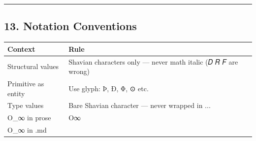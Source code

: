 \documentclass[12pt,a4paper]{article}
\begin{document}
\begin{center}\rule{0.5\linewidth}{0.5pt}\end{center}

\hypertarget{notation-conventions}{%
\subsection{13. Notation Conventions}\label{notation-conventions}}

\begin{longtable}[]{@{}ll@{}}
\toprule
\begin{minipage}[b]{0.56\columnwidth}\raggedright
Context\strut
\end{minipage} & \begin{minipage}[b]{0.38\columnwidth}\raggedright
Rule\strut
\end{minipage}\tabularnewline
\midrule
\endhead
\begin{minipage}[t]{0.56\columnwidth}\raggedright
Structural values\strut
\end{minipage} & \begin{minipage}[t]{0.38\columnwidth}\raggedright
Shavian characters only --- never math italic (𝐷 𝑅 𝐹 are wrong)\strut
\end{minipage}\tabularnewline
\begin{minipage}[t]{0.56\columnwidth}\raggedright
Primitive as entity\strut
\end{minipage} & \begin{minipage}[t]{0.38\columnwidth}\raggedright
Use glyph: Þ, Ð, Φ, ⊙ etc.\strut
\end{minipage}\tabularnewline
\begin{minipage}[t]{0.56\columnwidth}\raggedright
Type values\strut
\end{minipage} & \begin{minipage}[t]{0.38\columnwidth}\raggedright
Bare Shavian character --- never wrapped in \(...\)\strut
\end{minipage}\tabularnewline
\begin{minipage}[t]{0.56\columnwidth}\raggedright
O\_∞ in prose\strut
\end{minipage} & \begin{minipage}[t]{0.38\columnwidth}\raggedright
O∞\strut
\end{minipage}\tabularnewline
\begin{minipage}[t]{0.56\columnwidth}\raggedright
O\_∞ in .md\strut
\end{minipage} & \begin{minipage}[t]{0.38\columnwidth}\raggedright

\end{minipage}
\end{longtable}
\end{document}
